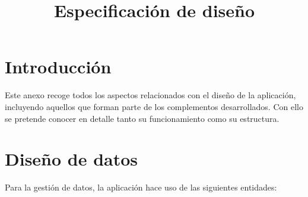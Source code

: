 \documentclass[
]{article}
\title{Especificación de diseño}
\author{}
\date{}
\begin{document}
\maketitle

\hypertarget{introducciuxf3n}{%
\section{Introducción}\label{introducciuxf3n}}

Este anexo recoge todos los aspectos relacionados con el diseño de la
aplicación, incluyendo aquellos que forman parte de los complementos
desarrollados. Con ello se pretende conocer en detalle tanto su
funcionamiento como su estructura.

\hypertarget{diseuxf1o-de-datos}{%
\section{Diseño de datos}\label{diseuxf1o-de-datos}}

Para la gestión de datos, la aplicación hace uso de las siguientes
entidades:
\end{document}
